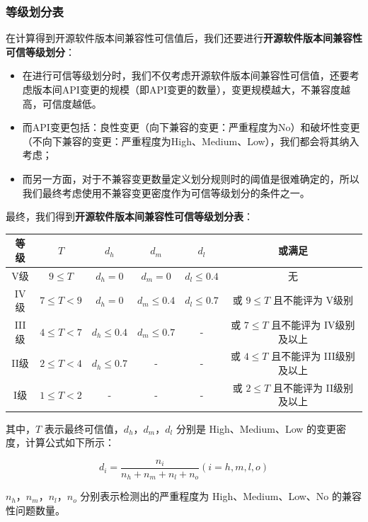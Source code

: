 \documentclass{article}
\begin{document}
\subsubsection{等级划分表}

在计算得到开源软件版本间兼容性可信值后，我们还要进行\textbf{开源软件版本间兼容性可信等级划分}：

\begin{itemize}
	\item 在进行可信等级划分时，我们不仅考虑开源软件版本间兼容性可信值，还要考虑版本间API变更的规模（即API变更的数量），变更规模越大，不兼容度越高，可信度越低。
	\item 而API变更包括：良性变更（向下兼容的变更：严重程度为No）和破坏性变更（不向下兼容的变更：严重程度为High、Medium、Low），我们都会将其纳入考虑；
	\item 而另一方面，对于不兼容变更数量定义划分规则时的阈值是很难确定的，所以我们最终考虑使用不兼容变更密度作为可信等级划分的条件之一。
\end{itemize}

最终，我们得到\textbf{开源软件版本间兼容性可信等级划分表}：

\begin{center}
	\begin{tabular}{|c|c|c|c|c|c|}
		\hline
		等级 & $T$ & $d_h$ & $d_m$ & $d_l$ & 或满足 \\
		\hline
		V级 & $9 \leq T$ & $d_h= 0$ & $d_m= 0$ & $d_l \leq 0.4$ & 无 \\
		\hline
		IV级 & $7 \leq T < 9$ & $d_h= 0$ & $d_m \leq 0.4$ & $d_l \leq 0.7$ & 或 $9 \leq T$ 且不能评为 V级别 \\
		\hline
		III级 & $4 \leq T < 7$ & $d_h \leq 0.4$ & $d_m \leq 0.7$ & - & 或 $7 \leq T$ 且不能评为 IV级别及以上 \\
		\hline
		II级 & $2 \leq T < 4$ & $d_h \leq 0.7$ & - & - & 或 $4 \leq T$ 且不能评为 III级别及以上 \\
		\hline
		I级 & $1 \leq T < 2$ & - & - & - & 或 $2 \leq T$ 且不能评为 II级别及以上 \\
		\hline
	\end{tabular}
\end{center}

其中，$ T $ 表示最终可信值，$ d_h $，$ d_m $，$ d_l $ 分别是 High、Medium、Low 的变更密度，计算公式如下所示：

$$ d_i = \frac{n_i}{n_h + n_m + n_l + n_o} (i = h, m, l, o) $$

$ n_h $，$ n_m $，$ n_l $，$ n_o $ 分别表示检测出的严重程度为 High、Medium、Low、No 的兼容性问题数量。
\end{document}
